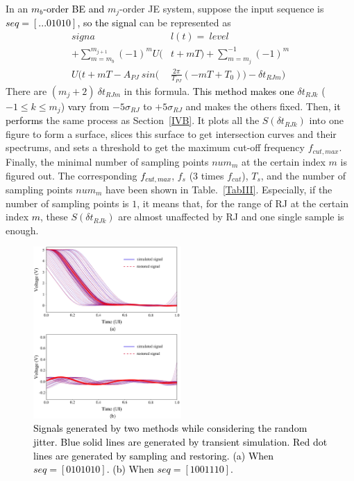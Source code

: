 \documentclass[conference]{IEEEtran}
\begin{document}
In an \textcolor{black}{$m_b$-order BE and} $m_j$-order JE system, suppose the input sequence is \textcolor{black}{$seq=[...01010]$, so the signal} can be represented as
\begin{equation}
\begin{split}
signa&l(t)=\ level\\
+\sum_{m=m_b}^{m_{j+1}}(-1)^mU(&t+mT)+\sum_{m=m_j}^{-1}(-1)^m\\
U(t+mT-A_{PJ}\ sin(&\frac{2\pi}{T_{PJ}}(-mT+T_0))-\delta t_{RJ m})
\end{split}
\label{eq11}
\end{equation}
There are $(m_j+2)\ \delta t_{RJ m}$ in this formula. \textcolor{black}{This method makes one} $\delta t_{RJ k}$ ($-1\leq k\leq m_j$) \textcolor{black}{vary} from $-5\sigma_{RJ}$ to $+5\sigma_{RJ}$ and makes the others fixed. Then, \textcolor{black}{it performs} the same process as Section~\ref{IVB}.
\color{black}
It plots all the $S(\delta t_{RJ k})$ into one figure to form a surface, slices this surface to get intersection curves and their spectrums, and sets a threshold to get the maximum cut-off frequency $f_{cut,max}$. Finally, the minimal number of sampling points $num_m$ at the certain index $m$ is figured out.
\color{black}
The corresponding \textcolor{black}{$f_{cut,max}$}, $f_s$ ($3$ times $f_{cut}$), $T_s$, and the number of sampling points $num_m$ have been shown in Table.~\ref{TabIII}. Especially, if the number of sampling points is $1$, it means that, for the range of RJ at the certain index \textcolor{black}{$m$}, these $S(\delta t_{RJ k})$ are almost unaffected by RJ and one single sample is enough.

\begin{figure}[tb]
\centerline{\includegraphics[width=160pt]{Fig12.png}}
\caption{\textcolor{black}{Signals generated by two methods while considering the random jitter. Blue solid lines are generated by transient simulation. Red dot lines are generated by sampling and restoring. (a) When $seq=[0101010]$. (b) When $seq=[1001110]$.}}
\label{Fig12}
\end{figure}
\end{document}
